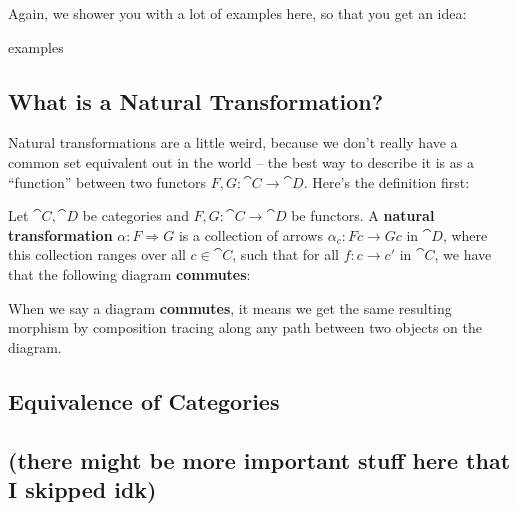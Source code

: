 Again, we shower you with a lot of examples here, so that you get an idea:
\begin{example}
  examples
\end{example}


\subsection{What is a Natural Transformation?}
Natural transformations are a little weird, because we don't really have a common set equivalent out in the world -- the best way to describe it is as a ``function'' between two functors $F, G : \cat C \to \cat D$. Here's the definition first:
\begin{definition}
  Let $\cat C, \cat D$ be categories and $F, G : \cat C \to \cat D$ be functors. A \textbf{natural transformation} $\alpha : F \Rightarrow G$ is a collection of arrows $\alpha_c : Fc \to Gc$ in $\cat D$, where this collection ranges over all $c \in \cat C$, such that for all $f : c \to c'$ in $\cat C$, we have that the following diagram \textbf{commutes}:
  \begin{center}
  \end{center}
  When we say a diagram \textbf{commutes}, it means we get the same resulting morphism by composition tracing along any path between two objects on the diagram.
\end{definition}


\subsection{Equivalence of Categories}

\subsection{(there might be more important stuff here that I skipped idk)}